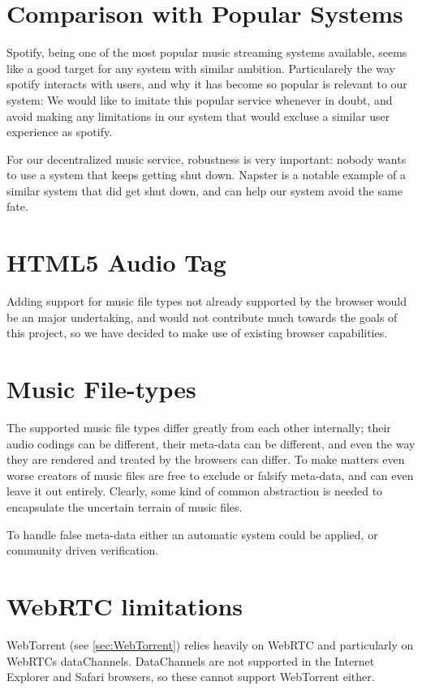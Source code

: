 \section{Comparison with Popular Systems}
Spotify, being one of the most popular music streaming systems available,
seems like a good target for any system with similar ambition.
Particularely the way spotify interacts with users,
and why it has become so popular is relevant to our system:
We would like to imitate this popular service whenever in doubt,
and avoid making any limitations in our system that would excluse a similar
user experience as spotify.

For our decentralized music service, robustness is very important:
nobody wants to use a system that keeps getting shut down.
Napster is a notable example of a similar system that did
get shut down, and can help our system avoid the same fate.


\section{HTML5 Audio Tag}
Adding support for music file types not already supported by the browser 
would be an major undertaking, 
and would not contribute much towards the goals of this project, 
so we have decided to make use of existing browser capabilities.

\section{Music File-types}
The supported music file types differ greatly from each other internally; 
their audio codings can be different, their meta-data can be different,
and even the way they are rendered and treated by the browsers can differ.
To make matters even worse creators of music files are free to exclude or falsify meta-data, 
and can even leave it out entirely.
Clearly, some kind of common abstraction is needed to encapsulate the uncertain terrain of music files.

To handle false meta-data either an automatic system could be applied, or
community driven verification.

\section{WebRTC limitations}
WebTorrent (see \ref{sec:WebTorrent}) relies heavily on WebRTC and particularly on WebRTCs dataChannels.
DataChannels are not supported in the Internet Explorer and Safari browsers, 
so these cannot support WebTorrent either.

